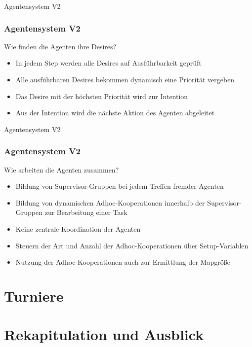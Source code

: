 \documentclass[aspectratio=169]{beamer} %
\begin{document}
\begin{frame}{Agentensystem V2}
	\frametitle{Agentensystem V2}
	\begin{block}{Wie finden die Agenten ihre Desires?}
	\end{block}
	\textbf{ }
	\begin{itemize}
		\setlength\itemsep{5mm}
		\item In jedem Step werden alle Desires auf Ausführbarkeit geprüft		
		\item Alle ausführbaren Desires bekommen dynamisch eine Priorität vergeben
		\item Das Desire mit der höchsten Priorität wird zur Intention
		\item Aus der Intention wird die nächste Aktion des Agenten abgeleitet
	\end{itemize}
\end{frame}

\begin{frame}{Agentensystem V2}
	\frametitle{Agentensystem V2}
	\begin{block}{Wie arbeiten die Agenten zusammen?}
	\end{block}
	\textbf{ }
	\begin{itemize}
		\setlength\itemsep{5mm}
		\item Bildung von Supervisor-Gruppen bei jedem Treffen fremder Agenten		
		\item Bildung von dynamischen Adhoc-Kooperationen innerhalb der Supervisor-Gruppen zur Bearbeitung einer Task
		\item Keine zentrale Koordination der Agenten
		\item Steuern der Art und Anzahl der Adhoc-Kooperationen über Setup-Variablen
		\item Nutzung der Adhoc-Kooperationen auch zur Ermittlung der Mapgröße
	\end{itemize}
\end{frame}

\section{Turniere}

\section{Rekapitulation und Ausblick}
\end{document}

